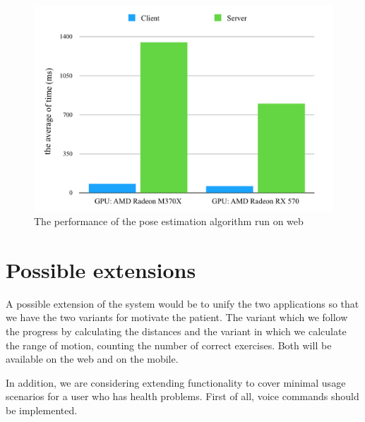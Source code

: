  \begin{figure}[htbp]
	\centerline{\includegraphics[scale=0.7]{fig/web-performace.png}}  
	\caption{The performance of the pose estimation algorithm run on web}
	\label{fig:web-perf}
\end{figure}

\section{Possible extensions}

A possible extension of the system would be to unify the two applications so that we have the two variants for motivate the patient. The variant which we follow the progress by calculating the distances and the variant in which we calculate the range of motion, counting the number of correct exercises.
Both will be available on the web and on the mobile.

In addition, we are considering extending functionality to cover minimal usage scenarios for a user who has health problems. First of all, voice commands should be implemented.

